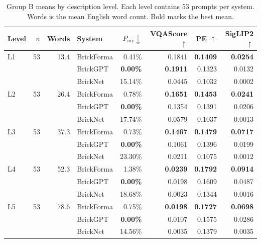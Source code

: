 \begin{table}[t]
\centering\small
\setlength{\tabcolsep}{3pt}
\begin{tabular}{lrrlrrrr}
\toprule
Level & $n$ & Words & System & $P_{\mathrm{inv}}\downarrow$ & VQAScore $\uparrow$ & PE $\uparrow$ & SigLIP2 $\uparrow$ \\
\midrule
L1 & 53 & 13.4 & BrickForma & 0.41\% & 0.1841 & \textbf{0.1409} & \textbf{0.0254} \\
 &  &  & BrickGPT & \textbf{0.00\%} & \textbf{0.1911} & 0.1323 & 0.0132 \\
 &  &  & BrickNet & 15.14\% & 0.0445 & 0.1032 & 0.0002 \\
\midrule
L2 & 53 & 26.4 & BrickForma & 0.78\% & \textbf{0.1651} & \textbf{0.1453} & \textbf{0.0241} \\
 &  &  & BrickGPT & \textbf{0.00\%} & 0.1354 & 0.1391 & 0.0206 \\
 &  &  & BrickNet & 17.74\% & 0.0579 & 0.1037 & 0.0013 \\
\midrule
L3 & 53 & 37.3 & BrickForma & 0.73\% & \textbf{0.1467} & \textbf{0.1479} & \textbf{0.0717} \\
 &  &  & BrickGPT & \textbf{0.00\%} & 0.1061 & 0.1396 & 0.0199 \\
 &  &  & BrickNet & 23.30\% & 0.0211 & 0.1075 & 0.0012 \\
\midrule
L4 & 53 & 52.3 & BrickForma & 1.38\% & \textbf{0.0239} & \textbf{0.1792} & \textbf{0.0914} \\
 &  &  & BrickGPT & \textbf{0.00\%} & 0.0198 & 0.1609 & 0.0487 \\
 &  &  & BrickNet & 18.68\% & 0.0023 & 0.1344 & 0.0016 \\
\midrule
L5 & 53 & 78.6 & BrickForma & 0.75\% & \textbf{0.0198} & \textbf{0.1727} & \textbf{0.0698} \\
 &  &  & BrickGPT & \textbf{0.00\%} & 0.0107 & 0.1575 & 0.0286 \\
 &  &  & BrickNet & 14.56\% & 0.0035 & 0.1379 & 0.0035 \\
\bottomrule
\end{tabular}
\caption{Group B means by description level. Each level contains 53 prompts per system. Words is the mean English word count. Bold marks the best mean.}
\label{tab:levels}
\end{table}
